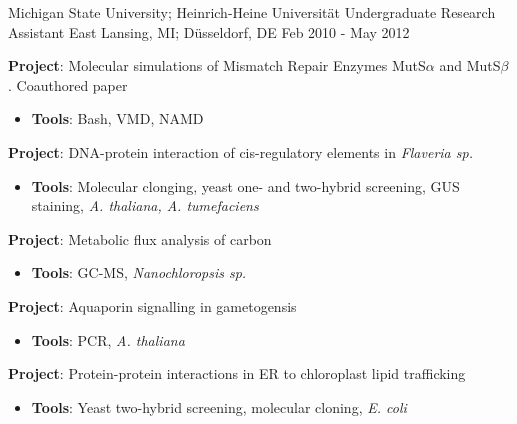 \begin{cventries}
  \cventry
    {Michigan State University; Heinrich-Heine Universit{\"a}t} %
    {Undergraduate Research Assistant} %
    {East Lansing, MI; D{\"u}sseldorf, DE} %
    {Feb 2010 - May 2012} %
    {
      \begin{cvitems} %
        \item {\textbf{Project}: Molecular simulations of Mismatch Repair Enzymes MutS$\alpha$ and MutS$\beta$. Coauthored paper}
        \begin{itemize}
        	\item {\textbf{Tools}: Bash, VMD, NAMD}
        \end{itemize}
        \item {\textbf{Project}: DNA-protein interaction of cis-regulatory elements in {\it Flaveria sp.}}
        \begin{itemize}
        	\item {\textbf{Tools}: Molecular clonging, yeast one- and two-hybrid screening, GUS staining, {\it A. thaliana, A. tumefaciens}}
        \end{itemize}
        \item {\textbf{Project}: Metabolic flux analysis of carbon}
        \begin{itemize}
        	\item {\textbf{Tools}: GC-MS, {\it Nanochloropsis sp.}}
        \end{itemize}
        \item {\textbf{Project}: Aquaporin signalling in gametogensis}
        \begin{itemize}
        	\item {\textbf{Tools}: PCR, {\it A. thaliana}}
        \end{itemize}
        \item {\textbf{Project}: Protein-protein interactions in ER to chloroplast lipid trafficking}
        \begin{itemize}
        	\item {\textbf{Tools}: Yeast two-hybrid screening, molecular cloning, {\it E. coli}}
        \end{itemize}
      \end{cvitems}
    }

\vspace{-4.0mm}
\end{cventries}
